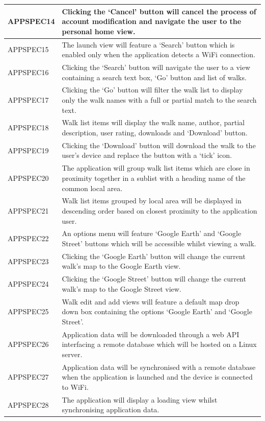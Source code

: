 \documentclass[11pt,a4paper]{article}
\begin{document}
\begin{longtable}{|p{2.5cm}p{13cm}|}
APPSPEC14 & Clicking the `Cancel' button will cancel the process of account modification and navigate the user to the personal home view. \\ \hline
APPSPEC15 & The launch view will feature a `Search' button which is enabled only when the application detects a WiFi connection. \\ \hline
APPSPEC16 & Clicking the `Search' button will navigate the user to a view containing a search text box, `Go' button and list of walks. \\ \hline
APPSPEC17 & Clicking the `Go' button will filter the walk list to display only the walk names with a full or partial match to the search text. \\ \hline
APPSPEC18 & Walk list items will display the walk name, author, partial description, user rating, downloads and `Download' button. \\ \hline
APPSPEC19 & Clicking the `Download' button will download the walk to the user's device and replace the button with a `tick' icon. \\ \hline
APPSPEC20 & The application will group walk list items which are close in proximity together in a sublist with a heading name of the common local area. \\ \hline
APPSPEC21 & Walk list items grouped by local area will be displayed in descending order based on closest proximity to the application user. \\ \hline
APPSPEC22 & An options menu will feature `Google Earth' and `Google Street' buttons which will be accessible whilst viewing a walk. \\ \hline
APPSPEC23 & Clicking the `Google Earth' button will change the current walk's map to the Google Earth view. \\ \hline
APPSPEC24 & Clicking the `Google Street' button will change the current walk's map to the Google Street view. \\ \hline
APPSPEC25 & Walk edit and add views will feature a default map drop down box containing the options `Google Earth' and `Google Street'. \\ \hline
APPSPEC26 & Application data will be downloaded through a web API interfacing a remote database which will be hosted on a Linux server.  \\ \hline
APPSPEC27 & Application data will be synchronised with a remote database when the application is launched and the device is connected to WiFi. \\ \hline
APPSPEC28 & The application will display a loading view whilst synchronising application data. \\ \hline

\end{longtable}
\end{document}
